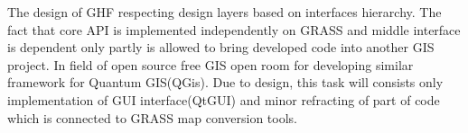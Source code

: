 \documentclass[a4paper,12pt,oneside]{report}
\begin{document}
	The design of GHF respecting design layers based on interfaces hierarchy. The fact that core API is implemented independently on GRASS  and middle interface is dependent only partly is allowed to bring developed code into another GIS project. In field of open source free GIS open room for developing similar framework for Quantum GIS(QGis). Due to design, this task will consists only implementation of GUI interface(QtGUI) and minor refracting of part of code which is connected to GRASS map conversion tools.

	
	
	\chapter*{}
	
		\listoffigures
		 
		\listoftables
	
	
\end{document}
